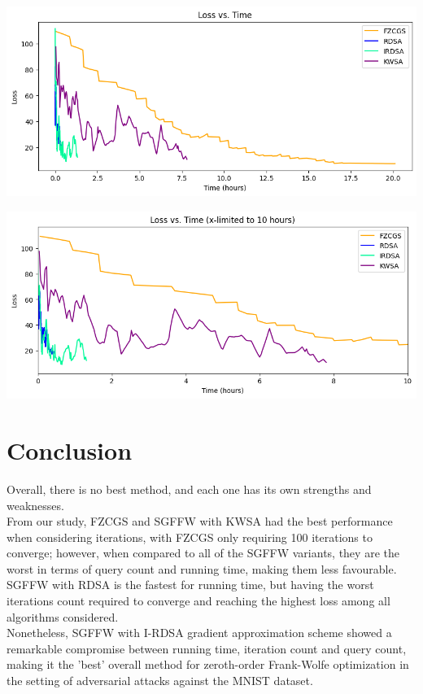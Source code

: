 \documentclass[10pt,twocolumn,letterpaper]{article}
\begin{document}
\begin{center}
   \includegraphics*[scale=0.35]{img/All_loss_vs_runningtime.png}
\end{center}
\begin{center}
   \includegraphics*[scale=0.35]{img/xLimit_All_loss_vs_runningtime.png}\\
\end{center}



\section{Conclusion}

Overall, there is no best method, and each one has its own strengths and weaknesses. \\

From our study, FZCGS and SGFFW with KWSA had the best performance when considering iterations,
with FZCGS only requiring 100 iterations to converge;
however, when compared to all of the SGFFW variants, they are the worst in terms
of query count and running time, making them less favourable. \\

SGFFW with RDSA is the fastest for running time, but having the
worst iterations count required to converge and reaching the highest loss among all algorithms considered. \\

Nonetheless, SGFFW with I-RDSA gradient approximation scheme showed a remarkable
compromise between running time, iteration count and query count, making it the 'best' overall method
for zeroth-order Frank-Wolfe optimization in the setting of adversarial attacks against the MNIST dataset.


{\small


}
\end{document}
